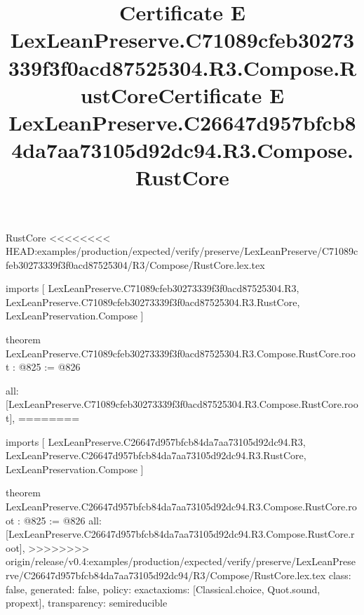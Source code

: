 \begin{lexlean}{RustCore}
<<<<<<<< HEAD:examples/production/expected/verify/preserve/LexLeanPreserve/C71089cfeb30273339f3f0acd87525304/R3/Compose/RustCore.lex.tex
\title{Certificate E LexLeanPreserve.C71089cfeb30273339f3f0acd87525304.R3.Compose.RustCore}
\begin{coremodule}
imports [
  LexLeanPreserve.C71089cfeb30273339f3f0acd87525304.R3,
  LexLeanPreserve.C71089cfeb30273339f3f0acd87525304.R3.RustCore,
  LexLeanPreservation.Compose
]

theorem LexLeanPreserve.C71089cfeb30273339f3f0acd87525304.R3.Compose.RustCore.root : @825 := @826 {
  all: [LexLeanPreserve.C71089cfeb30273339f3f0acd87525304.R3.Compose.RustCore.root],
========
\title{Certificate E LexLeanPreserve.C26647d957bfcb84da7aa73105d92dc94.R3.Compose.RustCore}
\begin{coremodule}
imports [
  LexLeanPreserve.C26647d957bfcb84da7aa73105d92dc94.R3,
  LexLeanPreserve.C26647d957bfcb84da7aa73105d92dc94.R3.RustCore,
  LexLeanPreservation.Compose
]

theorem LexLeanPreserve.C26647d957bfcb84da7aa73105d92dc94.R3.Compose.RustCore.root : @825 := @826 {
  all: [LexLeanPreserve.C26647d957bfcb84da7aa73105d92dc94.R3.Compose.RustCore.root],
>>>>>>>> origin/release/v0.4:examples/production/expected/verify/preserve/LexLeanPreserve/C26647d957bfcb84da7aa73105d92dc94/R3/Compose/RustCore.lex.tex
  class: false,
  generated: false,
  policy: exact{axioms: [Classical.choice, Quot.sound, propext]},
  transparency: semireducible
}


\end{coremodule}}
\end{coremodule}
\end{lexlean}
